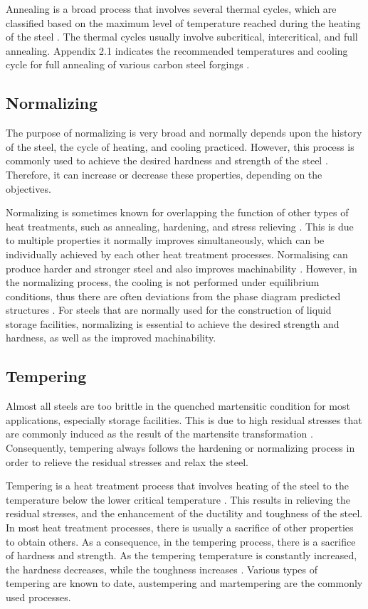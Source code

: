 Annealing is a broad process that involves several thermal cycles, which are classified based on the maximum level of temperature reached during the heating of the steel \cite{singh2020applied}. The thermal cycles usually involve subcritical, intercritical, and full annealing. Appendix 2.1 indicates the recommended temperatures and cooling cycle for full annealing of various carbon steel forgings \cite{singh2020applied}. 

\subsection{Normalizing}
The purpose of normalizing is very broad and normally depends upon the history of the steel, the cycle of heating, and cooling practiced. However, this process is commonly used to achieve the desired hardness and strength of the steel \cite{singh2020applied}. Therefore, it can increase or decrease these properties, depending on the objectives. 

Normalizing is sometimes known for overlapping the function of other types of heat treatments, such as annealing, hardening, and stress relieving \cite{singh2020applied}. This is due to multiple properties it normally improves simultaneously, which can be individually achieved by each other heat treatment processes. Normalising can produce harder and stronger steel and also improves machinability \cite{mampuya2021effect}. However, in the normalizing process, the cooling is not performed under equilibrium conditions, thus there are often deviations from the phase diagram predicted structures \cite{singh2020applied}.  For steels that are normally used for the construction of liquid storage facilities, normalizing is essential to achieve the desired strength and hardness, as well as the improved machinability.

\subsection{Tempering}  
Almost all steels are too brittle in the quenched martensitic condition for most applications, especially storage facilities. This is due to high residual stresses that are commonly induced as the result of the martensite transformation \cite{mampuya2021effect}. Consequently, tempering always follows the hardening or normalizing process in order to relieve the residual stresses and relax the steel. 

Tempering is a heat treatment process that involves heating of the steel to the temperature below the lower critical temperature \cite{singh2020applied}. This results in relieving the residual stresses, and the enhancement of the ductility and toughness of the steel. In most heat treatment processes, there is usually a sacrifice of other properties to obtain others. As a consequence, in the tempering process, there is a sacrifice of hardness and strength. As the tempering temperature is constantly increased, the hardness decreases, while the toughness increases \cite{singh2020applied}. Various types of tempering are known to date, austempering and martempering are the commonly used processes.

